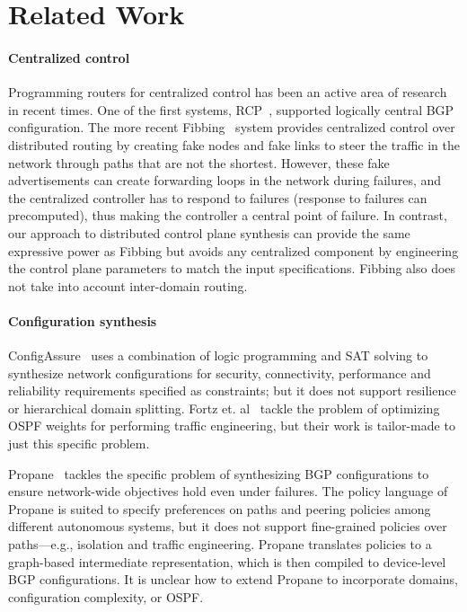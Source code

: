 \section{Related Work}\label{sec:related}
\paragraph{Centralized control} Programming routers for centralized
control has been an active area of research in recent times. One of
the first systems, RCP~\cite{rcp}, supported logically central BGP
configuration. The more recent Fibbing~\cite{fibbing} system provides
centralized control over distributed routing by creating fake nodes
and fake links to steer the traffic in the network through paths that
are not the shortest. However, these fake advertisements can create
forwarding loops in the network during failures, and the centralized
controller has to respond to failures (response to failures can
precomputed), thus making the controller a central point of
failure. In contrast, our approach to distributed control plane
synthesis can provide the same expressive power as Fibbing but avoids
any centralized component by engineering the control plane parameters
to match the input specifications.  Fibbing also does not take into
account inter-domain routing.


\paragraph{Configuration synthesis} 
ConfigAssure~\cite{configassure}
uses a combination of logic programming and SAT solving to synthesize
network configurations for security, 
connectivity, performance and
reliability requirements specified as constraints; 
but it does not
support resilience or hierarchical domain splitting.  Fortz
et. al~\cite{ospf-te} tackle the problem of optimizing OSPF weights
for performing traffic engineering, but their work is tailor-made
to just this specific problem.

Propane~\cite{propane} tackles the specific problem of synthesizing
BGP configurations to ensure network-wide objectives hold even under
failures. The policy language of Propane is suited to specify
preferences on paths and peering policies among different autonomous
systems, but it does not support fine-grained policies over paths---e.g.,  isolation and traffic engineering. Propane translates policies
to a graph-based intermediate representation, which is then compiled
to device-level BGP configurations. It is unclear how to extend
Propane to incorporate domains, configuration complexity, or OSPF.

